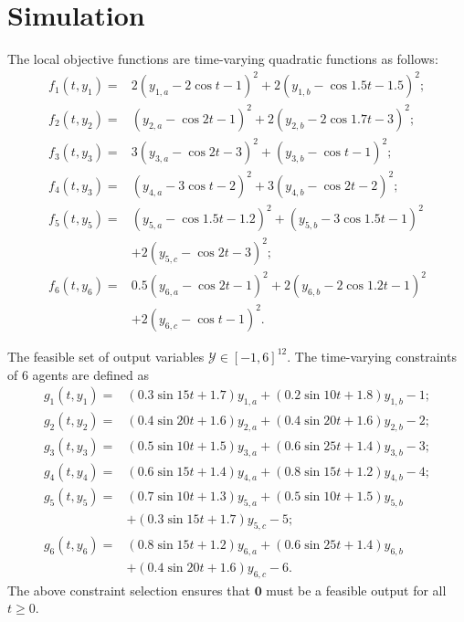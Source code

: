 \documentclass[final,5p,times,twocolumn,authoryear]{elsarticle}
\begin{document}
\section{Simulation}\label{sim}

		
		The local objective functions are time-varying quadratic functions as follows:
		\begin{align*}
			f_1(t,y_1)=&2(y_{1,a}{-}2\cos{t}{-}1)^2{+}2(y_{1,b}{-}\cos{1.5t}{-}1.5)^2;\\
			f_2(t,y_2)=&(y_{2,a}{-}\cos{2t}{-}1)^2{+}2(y_{2,b}{-}2\cos{1.7t}{-}3)^2;\\
			f_3(t,y_3)=&3(y_{3,a}{-}\cos{2t}{-}3)^2{+}(y_{3,b}{-}\cos{t}{-}1)^2;\\
			f_4(t,y_3)=&(y_{4,a}{-}3\cos{t}{-}2)^2{+}3(y_{4,b}{-}\cos{2t}{-}2)^2;\\
			f_5(t,y_5)=&(y_{5,a}{-}\cos{1.5t}{-}1.2)^2{+}(y_{5,b}{-}3\cos{1.5t}{-}1)^2\\
			&{+}2(y_{5,c}{-}\cos{2t}{-}3)^2;\\
			f_6(t,y_6)=&0.5(y_{6,a}{-}\cos{2t}{-}1)^2{+}2(y_{6,b}{-}2\cos{1.2t}{-}1)^2\\
			&{+}2(y_{6,c}{-}\cos{t}{-}1)^2.
		\end{align*}
		
		The feasible set of output variables $\mathcal{Y}\in[-1,6]^{12}$. The time-varying constraints of $6$ agents are defined as
		\begin{align*}
			g_1(t,y_1)=&(0.3\sin{15t}{+}1.7)y_{1,a}{+}(0.2\sin{10t}{+}1.8)y_{1,b}{-}1;\\
			g_2(t,y_2)=&(0.4\sin{20t}{+}1.6)y_{2,a}{+}(0.4\sin{20t}{+}1.6)y_{2,b}{-}2;\\
			g_3(t,y_3)=&(0.5\sin{10t}{+}1.5)y_{3,a}{+}(0.6\sin{25t}{+}1.4)y_{3,b}{-}3;\\
			g_4(t,y_4)=&(0.6\sin{15t}{+}1.4)y_{4,a}{+}(0.8\sin{15t}{+}1.2)y_{4,b}{-}4;\\
			g_5(t,y_5)=&(0.7\sin{10t}{+}1.3)y_{5,a}{+}(0.5\sin{10t}{+}1.5)y_{5,b}\\
			&{+}(0.3\sin{15t}{+}1.7)y_{5,c}{-}5;\\
			g_6(t,y_6)=&(0.8\sin{15t}{+}1.2)y_{6,a}{+}(0.6\sin{25t}{+}1.4)y_{6,b}\\
			&{+}(0.4\sin{20t}{+}1.6)y_{6,c}{-}6.
		\end{align*}
		The above constraint selection ensures that $\boldsymbol{0}$ must be a feasible output for all $t\ge 0$.
		
\end{document}
